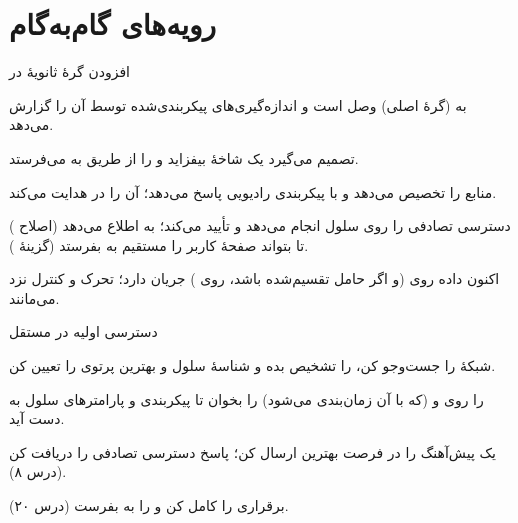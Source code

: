 \documentclass[11pt,a4paper]{article}
\begin{document}
\section{رویه‌های گام‌به‌گام}

\begin{procedurebox}{افزودن گرهٔ ثانویهٔ  در }\label{proc:endc}
\begin{steps}
  \item {} به   (گرهٔ اصلی) وصل است و اندازه‌گیری‌های  پیکربندی‌شده توسط آن را گزارش می‌دهد.
  \item {} تصمیم می‌گیرد یک شاخهٔ  بیفزاید و  را از طریق  به 
        می‌فرستد.
  \item {} منابع را تخصیص می‌دهد و با پیکربندی رادیویی  پاسخ می‌دهد؛  آن را در
         هدایت می‌کند.
  \item {} دسترسی تصادفی را روی سلول  انجام می‌دهد و تأیید می‌کند؛  به  اطلاع می‌دهد
        (اصلاح ) تا  بتواند صفحهٔ کاربر را مستقیم به  بفرستد (گزینهٔ ).
  \item اکنون داده روی  (و اگر حامل تقسیم‌شده باشد، روی ) جریان دارد؛ تحرک و کنترل نزد 
        می‌مانند.
\end{steps}
\end{procedurebox}

\begin{procedurebox}{دسترسی اولیه در  مستقل}\label{proc:access}
\begin{steps}
  \item شبکهٔ  را جست‌وجو کن،  را تشخیص بده و شناسهٔ سلول و بهترین پرتوی  را تعیین کن.
  \item {} را روی  و  (که با آن زمان‌بندی می‌شود) را بخوان تا پیکربندی  و پارامترهای
        سلول به دست آید.
  \item یک پیش‌آهنگ را در فرصت  بهترین  ارسال کن؛ پاسخ دسترسی تصادفی را دریافت کن (درس ۸).
  \item برقراری  را کامل کن و  را به  بفرست (درس ۲۰).
\end{steps}
\end{procedurebox}

\end{document}
